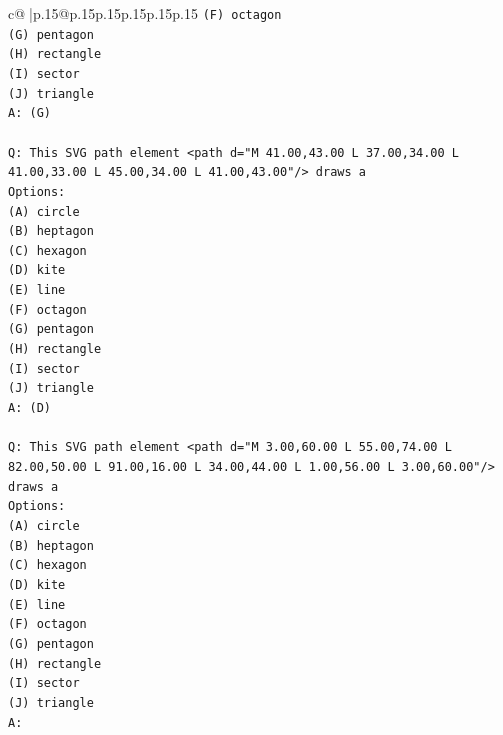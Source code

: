 \documentclass{article}
\begin{document}
{\begin{supertabular}{c@{$\;$}|p{.15\linewidth}@{}p{.15\linewidth}p{.15\linewidth}p{.15\linewidth}p{.15\linewidth}p{.15\linewidth}}
{{{\texttt{(F) octagon} \\
\texttt{(G) pentagon} \\
\texttt{(H) rectangle} \\
\texttt{(I) sector} \\
\texttt{(J) triangle} \\
\texttt{A: (G)} \\
\\ 
\texttt{Q: This SVG path element <path d="M 41.00,43.00 L 37.00,34.00 L 41.00,33.00 L 45.00,34.00 L 41.00,43.00"/> draws a} \\
\texttt{Options:} \\
\texttt{(A) circle} \\
\texttt{(B) heptagon} \\
\texttt{(C) hexagon} \\
\texttt{(D) kite} \\
\texttt{(E) line} \\
\texttt{(F) octagon} \\
\texttt{(G) pentagon} \\
\texttt{(H) rectangle} \\
\texttt{(I) sector} \\
\texttt{(J) triangle} \\
\texttt{A: (D)} \\
\\ 
\texttt{Q: This SVG path element <path d="M 3.00,60.00 L 55.00,74.00 L 82.00,50.00 L 91.00,16.00 L 34.00,44.00 L 1.00,56.00 L 3.00,60.00"/> draws a} \\
\texttt{Options:} \\
\texttt{(A) circle} \\
\texttt{(B) heptagon} \\
\texttt{(C) hexagon} \\
\texttt{(D) kite} \\
\texttt{(E) line} \\
\texttt{(F) octagon} \\
\texttt{(G) pentagon} \\
\texttt{(H) rectangle} \\
\texttt{(I) sector} \\
\texttt{(J) triangle} \\
\texttt{A:} \\
            }
        }
    }
     \\ \\


\end{supertabular}}
\end{document}
